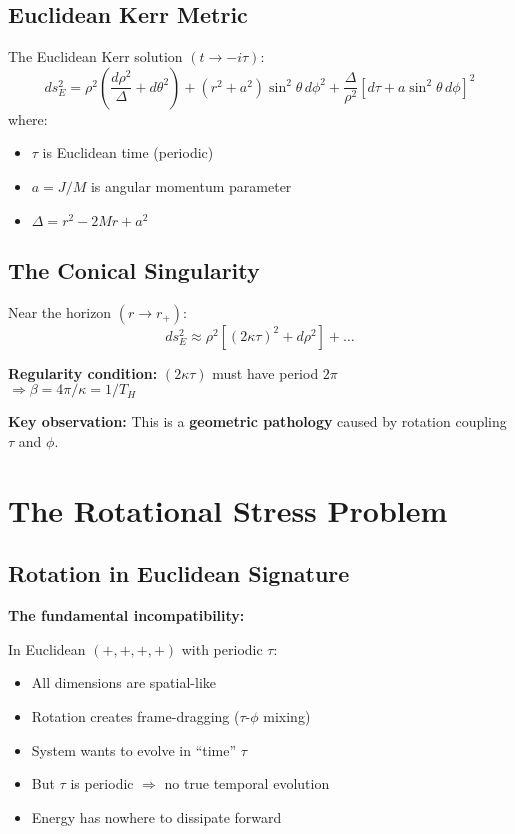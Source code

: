 \documentclass[11pt]{article}
\begin{document}
\subsection{Euclidean Kerr Metric}

The Euclidean Kerr solution $(t \to -i\tau)$:
\begin{equation}
ds^2_E = \rho^2\left(\frac{d\rho^2}{\Delta} + d\theta^2\right) + (r^2+a^2)\sin^2\theta\, d\phi^2 + \frac{\Delta}{\rho^2}[d\tau + a\sin^2\theta\, d\phi]^2
\end{equation}
where:
\begin{itemize}
\item $\tau$ is Euclidean time (periodic)
\item $a = J/M$ is angular momentum parameter
\item $\Delta = r^2 - 2Mr + a^2$
\end{itemize}

\subsection{The Conical Singularity}

Near the horizon $(r \to r_+)$:
\begin{equation}
ds^2_E \approx \rho^2[(2\kappa\tau)^2 + d\rho^2] + \ldots
\end{equation}

\textbf{Regularity condition:} $(2\kappa\tau)$ must have period $2\pi$ \\
$\Rightarrow \beta = 4\pi/\kappa = 1/T_H$

\textbf{Key observation:} This is a \textbf{geometric pathology} caused by rotation coupling $\tau$ and $\phi$.

\section{The Rotational Stress Problem}

\subsection{Rotation in Euclidean Signature}

\textbf{The fundamental incompatibility:}

In Euclidean $(+,+,+,+)$ with periodic $\tau$:
\begin{itemize}
\item All dimensions are spatial-like
\item Rotation creates frame-dragging ($\tau$-$\phi$ mixing)
\item System wants to evolve in ``time'' $\tau$
\item But $\tau$ is periodic $\Rightarrow$ no true temporal evolution
\item Energy has nowhere to dissipate forward
\end{itemize}
\end{document}
